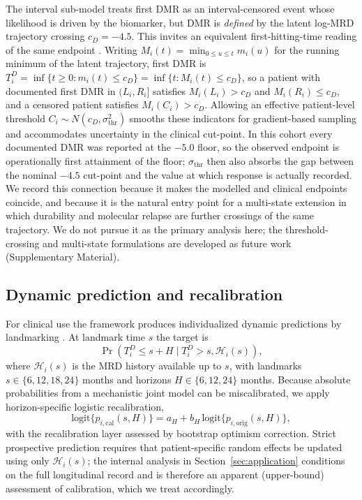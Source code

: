 \documentclass[11pt]{article}
\begin{document}
The interval sub-model treats first DMR as an interval-censored event whose
likelihood is driven by the biomarker, but DMR is \emph{defined} by the
latent log-MRD trajectory crossing $c_D=-4.5$. This invites an equivalent
first-hitting-time reading of the same endpoint
\cite{LeeWhitmore2006ThresholdRegression,AalenGjessing2001ProcessView}.
Writing $M_i(t)=\min_{0\le u\le t}m_i(u)$ for the running minimum of the
latent trajectory, first DMR is
$T_i^D=\inf\{t\ge 0:m_i(t)\le c_D\}=\inf\{t:M_i(t)\le c_D\}$, so a patient
with documented first DMR in $(L_i,R_i]$ satisfies $M_i(L_i)>c_D$ and
$M_i(R_i)\le c_D$, and a censored patient satisfies $M_i(C_i)>c_D$. Allowing
an effective patient-level threshold $C_i\sim N(c_D,\sigma_{\mathrm{thr}}^2)$
smooths these indicators for gradient-based sampling and accommodates
uncertainty in the clinical cut-point. In this cohort every documented DMR was
reported at the $-5.0$ floor, so the observed endpoint is operationally first
attainment of the floor; $\sigma_{\mathrm{thr}}$ then also absorbs the gap
between the nominal $-4.5$ cut-point and the value at which response is
actually recorded. We record this connection because it
makes the modelled and clinical endpoints coincide, and because it is the
natural entry point for a multi-state extension in which durability and
molecular relapse are further crossings of the same trajectory. We do not
pursue it as the primary analysis here; the threshold-crossing and
multi-state formulations are developed as future work (Supplementary
Material).

\subsection{Dynamic prediction and recalibration}
\label{sec:dynamic}

For clinical use the framework produces individualized dynamic predictions by
landmarking \cite{vanHouwelingen2007Landmarking,Rizopoulos2011DynamicPredictions}.
At landmark time $s$ the target is
\[
\Pr(T_i^D\le s+H\mid T_i^D>s,\mathcal H_i(s)),
\]
where $\mathcal H_i(s)$ is the MRD history available up to $s$, with
landmarks $s\in\{6,12,18,24\}$ months and horizons $H\in\{6,12,24\}$
months. Because absolute probabilities from a mechanistic joint model can
be miscalibrated, we apply horizon-specific logistic recalibration,
\[
\mathrm{logit}\{p_{i,\mathrm{cal}}(s,H)\}
=a_H+b_H\,\mathrm{logit}\{p_{i,\mathrm{orig}}(s,H)\},
\]
with the recalibration layer assessed by bootstrap optimism correction.
Strict prospective prediction requires that patient-specific random
effects be updated using only $\mathcal H_i(s)$; the internal analysis in
Section~\ref{sec:application} conditions on the full longitudinal record
and is therefore an apparent (upper-bound) assessment of calibration,
which we treat accordingly.
\end{document}
